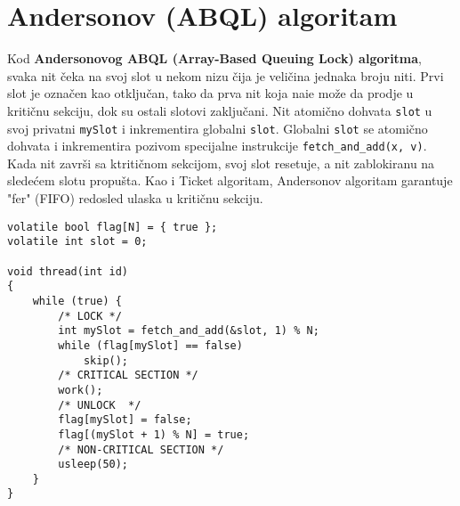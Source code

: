 \clearpage
\section{Andersonov (ABQL) algoritam}
Kod \textbf{Andersonovog ABQL (Array-Based Queuing Lock) algoritma}, svaka nit \v{c}eka na svoj slot u nekom nizu \v{c}ija je veli\v{c}ina jednaka broju niti. Prvi slot je ozna\v{c}en kao otklju\v{c}an, tako da prva nit koja nai\dj{}e mo\v{z}e da prodje u kriti\v{c}nu sekciju, dok su ostali slotovi zaklju\v{c}ani. Nit atomi\v{c}no dohvata \texttt{slot} u svoj privatni \texttt{mySlot} i inkrementira globalni \texttt{slot}. Globalni \texttt{slot} se atomi\v{c}no dohvata i inkrementira pozivom specijalne instrukcije \texttt{fetch\_and\_add(x, v)}. Kada nit zavr\v{s}i sa ktriti\v{c}nom sekcijom, svoj slot resetuje, a nit zablokiranu na slede\'{c}em slotu propu\v{s}ta. Kao i Ticket algoritam, Andersonov algoritam garantuje "fer" (FIFO) redosled ulaska u kriti\v{c}nu sekciju.
\begin{lstlisting}
volatile bool flag[N] = { true };
volatile int slot = 0;

void thread(int id)
{
    while (true) {
        /* LOCK */
		int mySlot = fetch_and_add(&slot, 1) % N;
        while (flag[mySlot] == false)
            skip();
        /* CRITICAL SECTION */
        work();
        /* UNLOCK  */
        flag[mySlot] = false;
        flag[(mySlot + 1) % N] = true;
        /* NON-CRITICAL SECTION */
        usleep(50);
    }
}
\end{lstlisting}